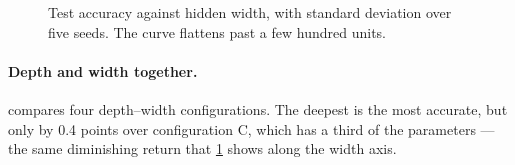 \begin{figure}[t]
  \centering
  
  \caption{Test accuracy against hidden width, with standard deviation over five
    seeds. The curve flattens past a few hundred units.}
  \label{fig:width}
\end{figure}

\paragraph{Depth and width together.}
 compares four depth--width configurations.
The deepest is the most accurate, but only by \num{0.4} points over configuration
C, which has a third of the parameters --- the same diminishing return that
\cref{fig:width} shows along the width axis.

\begin{table}[t]
  \centering
  \caption{Depth--width configurations, parameter counts, and test error.}
  \label{tab:benchmark}
  
\end{table}
